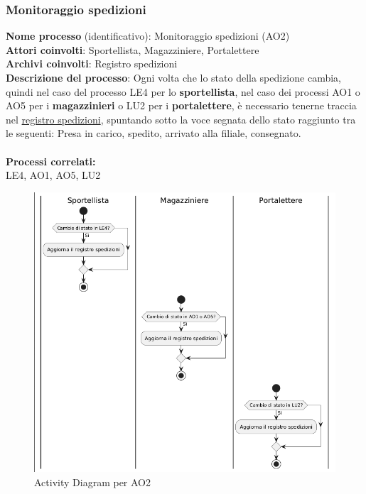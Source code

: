 \documentclass[a4paper,12pt]{article}
\begin{document}
\newpage
\subsubsection{Monitoraggio spedizioni}
\textbf{Nome processo} (identificativo): Monitoraggio spedizioni (AO2)\\
\textbf{Attori coinvolti}: Sportellista, Magazziniere, Portalettere \\
\textbf{Archivi coinvolti}: Registro spedizioni \\
\textbf{Descrizione del processo}: Ogni volta che lo stato della spedizione cambia, quindi nel caso del processo LE4 per lo \textbf{sportellista},
nel caso dei processi AO1 o AO5 per i \textbf{magazzinieri} o LU2 per i \textbf{portalettere}, è necessario tenerne traccia nel 
\underline{registro spedizioni}, spuntando sotto la voce segnata dello stato raggiunto tra le seguenti: Presa in carico, spedito, arrivato alla filiale, consegnato. \\ \\
\textbf{Processi correlati:}\\LE4, AO1, AO5, LU2\\
\begin{figure}[H]
  \centering
  \includegraphics[width=0.8\linewidth]{assets/activitydiagram_AO2.png}
	\caption{Activity Diagram per AO2}
\end{figure}

\newpage
\end{document}
